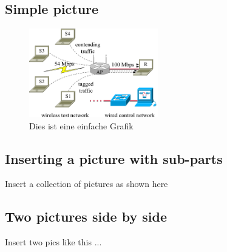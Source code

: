 \subsection{Simple picture}
\label{sec:chapter03:grafiken:simple}


\begin{figure}[htbp]
 \centering
 \includegraphics[width=0.5\textwidth]{4.graphics/figures/setup}
 \caption{Dies ist eine einfache Grafik}
 \label{fig:chapter03:setup}
\end{figure}



\subsection{Inserting a picture with sub-parts}
\label{sec:chapter03:grafiken:subfloat}

Insert a collection of pictures as shown here




\subsection{Two pictures side by side}
\label{sec:chapter03:grafiken:minipage}
Insert two pics like this ...

